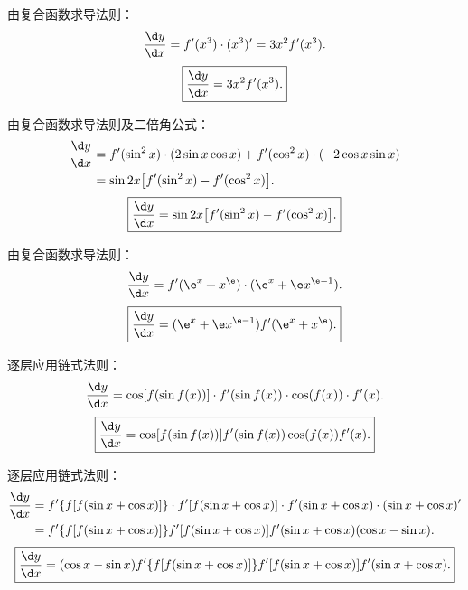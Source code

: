 \begin{solution}

    由复合函数求导法则：
    \begin{equation}
        \frac{\d y}{\d x} = f'(x^3) \cdot (x^3)' = 3x^2 f'(x^3).
    \end{equation}
    \begin{equation}
        \boxed{\frac{\d y}{\d x} = 3x^2 f'(x^3).}
    \end{equation}


    由复合函数求导法则及二倍角公式：
    \begin{equation}
        \begin{aligned}
            \frac{\d y}{\d x} & = f'(\sin^2 x) \cdot (2\sin x \cos x) + f'(\cos^2 x) \cdot (-2\cos x \sin x) \\
                              & = \sin 2x \bigl[ f'(\sin^2 x) - f'(\cos^2 x) \bigr].
        \end{aligned}
    \end{equation}
    \begin{equation}
        \boxed{\frac{\d y}{\d x} = \sin 2x \bigl[ f'(\sin^2 x) - f'(\cos^2 x) \bigr].}
    \end{equation}


    由复合函数求导法则：
    \begin{equation}
        \frac{\d y}{\d x} = f'(\e^x + x^{\e}) \cdot (\e^x + \e x^{\e - 1}).
    \end{equation}
    \begin{equation}
        \boxed{\frac{\d y}{\d x} = (\e^x + \e x^{\e - 1}) f'(\e^x + x^{\e}).}
    \end{equation}


    逐层应用链式法则：
    \begin{equation}
        \frac{\d y}{\d x} = \cos[f(\sin f(x))] \cdot f'(\sin f(x)) \cdot \cos(f(x)) \cdot f'(x).
    \end{equation}
    \begin{equation}
        \boxed{\frac{\d y}{\d x} = \cos[f(\sin f(x))] f'(\sin f(x)) \cos(f(x)) f'(x).}
    \end{equation}


    逐层应用链式法则：
    \begin{equation}
        \begin{aligned}
            \frac{\d y}{\d x} & = f'\{f[f(\sin x + \cos x)]\} \cdot f'[f(\sin x + \cos x)] \cdot f'(\sin x + \cos x) \cdot (\sin x + \cos x)' \\
                              & = f'\{f[f(\sin x + \cos x)]\} f'[f(\sin x + \cos x)] f'(\sin x + \cos x) (\cos x - \sin x).
        \end{aligned}
    \end{equation}
    \begin{equation}
        \boxed{\frac{\d y}{\d x} = (\cos x - \sin x) f'\{f[f(\sin x + \cos x)]\} f'[f(\sin x + \cos x)] f'(\sin x + \cos x).}
    \end{equation}


\end{solution}

